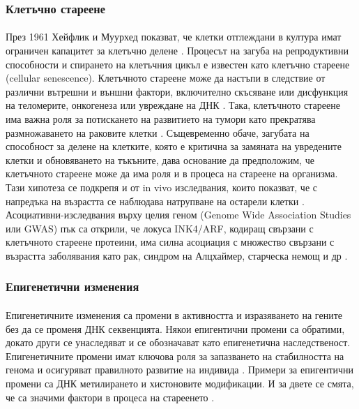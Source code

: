 \documentclass[pdftex,cyrillic,14pt,a4page,twoside,openright]{extreport}
\begin{document}
\subsubsection{Клетъчно стареене}
\paragraph{}
През 1961 Хейфлик и Муурхед показват, че клетки отглеждани в култура имат ограничен капацитет за клетъчно делене \cite{hayflick1961serial}. Процесът на загуба на репродуктивни способности и спирането на клетъчния цикъл е известен като клетъчно стареене (cellular senescence). Клетъчното стареене може да настъпи в следствие от различни вътрешни и външни фактори, включително скъсяване или дисфункция на теломерите, онкогенеза или увреждане на ДНК \cite{micco2021}. Така, клетъчното стареене има важна роля за потискането на развитието на тумори като прекратява размножаването на раковите клетки \cite{jeyapalan2008}. Същевременно обаче, загубата на способност за делене на клетките, която е критична за замяната на увредените клетки и обновяването на тъкъните, дава основание да предположим, че клетъчното стареене може да има роля и в процеса на стареене на организма. Тази хипотеза се подкрепя и от in vivo изследвания, които показват, че с напредъка на възрастта се наблюдава натрупване на остарели клетки \cite{jeyapalan2008}. Асоциативни-изследвания върху целия геном (Genome Wide Association Studies или GWAS) пък са открили, че локуса INK4/ARF, кодиращ свързани с клетъчното стареене протеини, има силна асоциация с множество свързани с възрастта заболявания като рак, синдром на Алцхаймер, старческа немощ и др \cite{jeck2012meta}.

\subsubsection{Епигенетични изменения}
\paragraph{}
Епигенетичните изменения са промени в активността и изразяването на гените без да се променя ДНК секвенцията. Някои епигентични промени са обратими, докато други се унаследяват и се обозначават като епигенетична наследственост. Епигенетичните промени имат ключова роля за запазването на стабилността на генома и осигуряват правилното развитие на индивида \cite{dupont2009}. Примери за епигентични промени са ДНК метилирането и хистоновите модификации. И за двете се смята, че са значими фактори в процеса на стареенето \cite{daquila2013}\cite{aitbaev2019}.
\end{document}
